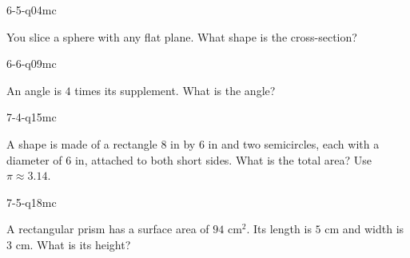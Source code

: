 \begin{practiceQuestion}{6-5-q04}{mc}
\begin{questionText}
You slice a sphere with any flat plane. What shape is the cross-section?
\end{questionText}
\end{practiceQuestion}

\begin{practiceQuestion}{6-6-q09}{mc}
\begin{questionText}
An angle is $4$ times its supplement. What is the angle?
\end{questionText}
\end{practiceQuestion}

\begin{practiceQuestion}{7-4-q15}{mc}
\begin{questionText}
A shape is made of a rectangle $8$ in by $6$ in and two semicircles, each with a diameter of $6$ in, attached to both short sides. What is the total area? Use $\pi \approx 3.14$.
\end{questionText}
\end{practiceQuestion}

\begin{practiceQuestion}{7-5-q18}{mc}
\begin{questionText}
A rectangular prism has a surface area of $94$ cm$^2$. Its length is $5$ cm and width is $3$ cm. What is its height?
\end{questionText}
\end{practiceQuestion}

